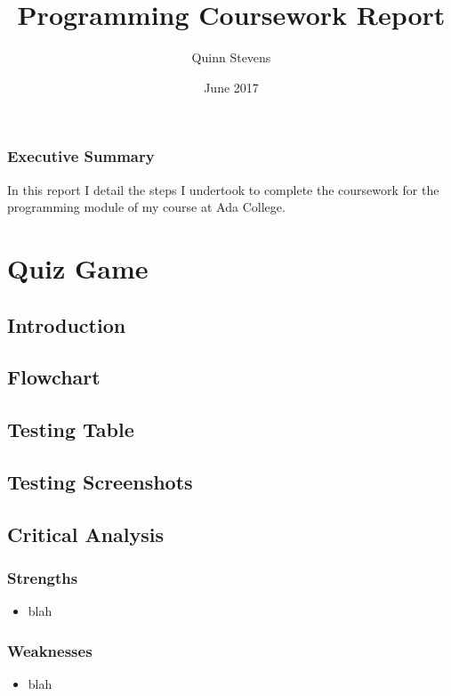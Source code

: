 \documentclass{report}
\title{Programming Coursework Report}
\author{Quinn Stevens}
\date{June 2017}
\begin{document}
\maketitle

\section*{Executive Summary}
In this report I detail the steps I undertook to complete the coursework for the programming module of my course at Ada College.

\tableofcontents

\part{Quiz Game}
    \chapter{Introduction}

    \chapter{Flowchart}

    \chapter{Testing Table}
    
    \chapter{Testing Screenshots}

    \chapter{Critical Analysis}
        \section{Strengths}
        \begin{itemize}
            \item blah
        \end{itemize}
        
        \section{Weaknesses}
        \begin{itemize}
            \item blah
        \end{itemize}
        
\end{document}
